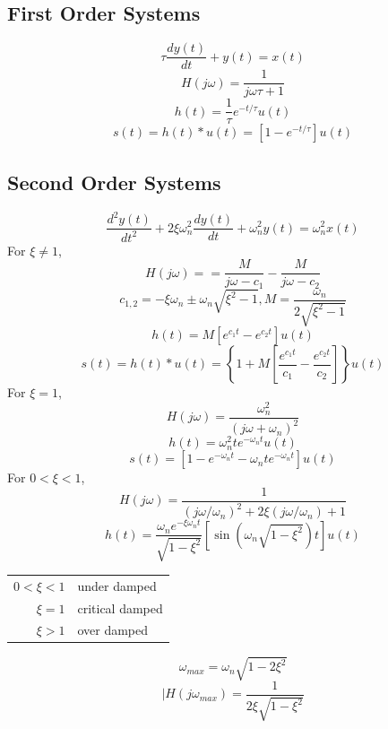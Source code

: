 \documentclass[landscape,a4paper]{article}
\begin{document}
\begin{multicols}{3}
\subsection*{First Order Systems}
$$\tau\frac{dy(t)}{dt}+y(t)=x(t)$$
$$H(j\omega)=\frac{1}{j\omega\tau+1}$$
$$h(t)=\frac{1}{\tau}e^{-t/\tau}u(t)$$
$$s(t)=h(t)*u(t)=[1-e^{-t/\tau}]u(t)$$

\subsection*{Second Order Systems}
$$\frac{d^2y(t)}{dt^2}+2\xi\omega_n^2\frac{dy(t)}{dt}+\omega_n^2y(t)=\omega_n^2x(t)$$
For $\xi\neq1$,
$$H(j\omega)==\frac{M}{j\omega-c_1}-\frac{M}{j\omega-c_2}$$
$$c_{1,2}=-\xi\omega_n\pm\omega_n\sqrt{\xi^2-1},M=\frac{\omega_n}{2\sqrt{\xi^2-1}}$$
$$h(t)=M[e^{c_1t}-e^{c_2t}]u(t)$$
$$s(t)=h(t)*u(t)=\left\{1+M\left[\frac{e^{c_1t}}{c_1}-\frac{e^{c_2t}}{c_2}\right]\right\}u(t)$$
For $\xi=1$,
$$H(j\omega)=\frac{\omega_n^2}{(j\omega+\omega_n)^2}$$
$$h(t)=\omega_n^2te^{-\omega_nt}u(t)$$
$$s(t)=[1-e^{-\omega_nt}-\omega_nte^{-\omega_nt}]u(t)$$
For $0<\xi<1$,
$$H(j\omega)=\frac{1}{(j\omega/\omega_n)^2+2\xi(j\omega/\omega_n)+1}$$
$$h(t)=\frac{\omega_ne^{-\xi\omega_nt}}{\sqrt{1-\xi^2}}[\sin(\omega_n\sqrt{1-\xi^2})t]u(t)$$

\begin{center}
\begin{tabular}{rl}
	$0<\xi<1$ & under damped \\
	$\xi=1$ & critical damped \\
	$\xi>1$ & over damped \\
\end{tabular}
\end{center}

$$\omega_{max}=\omega_n\sqrt{1-2\xi^2}$$
$$|H(j\omega_{max})=\frac{1}{2\xi\sqrt{1-\xi^2}}$$

\end{multicols}
\end{document}
